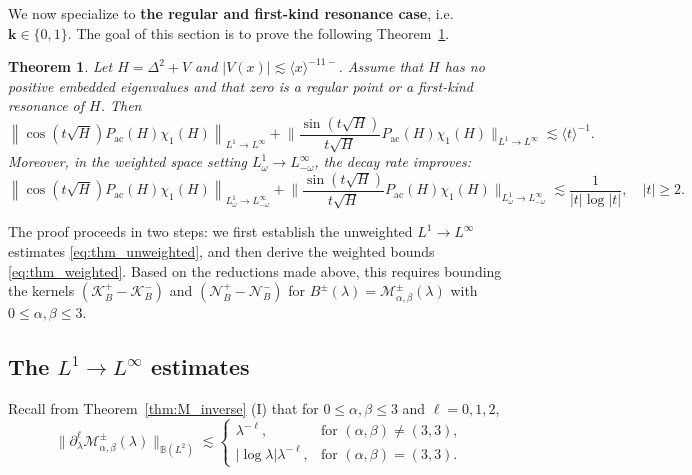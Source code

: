 \documentclass[reqno]{amsart}
\newtheorem{theorem}{Theorem}[section]
\numberwithin{equation}{section}
\begin{document}
\vskip0.3cm
We now specialize to \textbf{the regular and first-kind resonance case},
i.e. $\mathbf k\in\{0,1\}$. The goal of this section is to prove the following  Theorem~\ref{main_theorem_low_1}.
\begin{theorem}\label{main_theorem_low_1}
	Let $H = \Delta^2 + V$ and $|V(x)| \lesssim \langle x \rangle^{-11-}$.
	Assume that $H$ has no positive embedded eigenvalues and that zero is a regular point or a first-kind resonance of $H$. Then
	\begin{equation}\label{eq:thm_unweighted}
		\left\|\cos (t \sqrt{H}) P_{\mathrm{ac}}(H)\chi_1(H)\right\|_{L^1 \rightarrow L^{\infty}}+
		\bigg \|\frac{\sin (t \sqrt{H})}{t\sqrt{H}} P_{\mathrm{ac}}(H)\chi_1(H)\bigg \|_{L^1 \rightarrow L^{\infty}} \lesssim \langle t \rangle^{-1}.
	\end{equation}
	Moreover, in the weighted space setting $L^1_\omega \to L^{\infty}_{-\omega}$, the decay rate improves:
	\begin{equation}\label{eq:thm_weighted}
		\left\|\cos (t \sqrt{H}) P_{\mathrm{ac}}(H)\chi_1(H)\right\|_{L^1_\omega \rightarrow L^{\infty}_{-\omega}}
		+\bigg\|\frac{\sin (t \sqrt{H})}{t\sqrt{H}} P_{\mathrm{ac}}(H)\chi_1(H)\bigg\|_{L^1_\omega \rightarrow L^{\infty}_{-\omega}} \lesssim \frac{1}{ |t| \log |t|}, \quad |t| \ge 2.
	\end{equation}
\end{theorem}

The proof proceeds in two steps: we first establish the unweighted $L^1\to L^\infty$ estimates \eqref{eq:thm_unweighted}, and then  derive the weighted bounds \eqref{eq:thm_weighted}.
Based on the reductions made above, this requires bounding the kernels $(\mathcal{K}_{B}^+ - \mathcal{K}_{B}^-)$ and $(\mathcal{N}_{B}^+ - \mathcal{N}_{B}^-)$  for  $B^\pm(\lambda) = \mathcal{M}_{\alpha,\beta}^{\pm}(\lambda)$ with $0 \le \alpha,\beta \le 3$.


\subsection{The $L^1 \rightarrow L^{\infty}$ estimates}\label{subsec:regular_first_1}
Recall from Theorem~\ref{thm:M_inverse} (I) that for $0 \le \alpha, \beta \le 3$ and $\ell = 0,1,2$,
\[
\Big\| \partial_\lambda^\ell \mathcal{M}_{\alpha,\beta}^\pm(\lambda) \Big\|_{\mathbb{B}(L^2)} \lesssim
\begin{cases}
	\lambda^{-\ell}, & \text{for } ( \alpha,\beta) \neq (3,3), \\
	|\log \lambda| \lambda^{-\ell}, &  \text{for } (\alpha,\beta) = (3,3).
\end{cases}
\]
\end{document}
